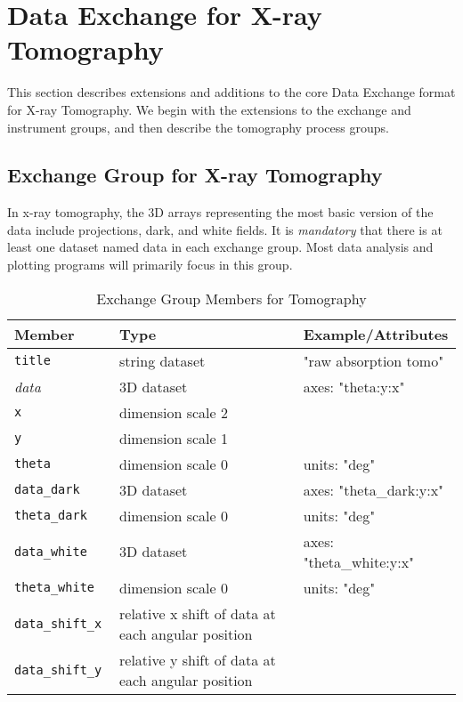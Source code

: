 \section{Data Exchange for X-ray Tomography}
\label{exchange:tomography}

This section describes extensions and additions to the core Data Exchange format for X-ray Tomography. We begin with the extensions to the exchange and instrument groups, and then describe the tomography process groups.

\subsection{Exchange Group for X-ray Tomography}

In x-ray tomography, the 3D arrays representing the most basic version of the data include projections, dark, and white fields. It is \emph{mandatory} that there is at least one dataset named data in each exchange group. Most data analysis and plotting programs will primarily focus in this group.

\begin{table}[h!]\sffamily \footnotesize
\caption{Exchange Group Members for Tomography}
\centering
{}
\begin{tabular}{l l l}
\toprule
\bfseries Member     & \bfseries Type & \bfseries Example/Attributes \\
\midrule
\tt{title}  & string dataset & "raw absorption tomo" \\
\emph{data}  & 3D dataset & axes: "theta:y:x"  \\
\tt{x} & dimension scale 2 &  \\
\tt{y} & dimension scale 1 &  \\
\tt{theta} & dimension scale 0 & units: "deg" \\
\tt{data\_dark} & 3D dataset & axes: "theta\_dark:y:x" \\
\tt{theta\_dark} & dimension scale 0 & units: "deg" \\
\tt{data\_white}  & 3D dataset & axes: "theta\_white:y:x" \\
\tt{theta\_white} & dimension scale 0 & units: "deg" \\
\tt{data\_shift\_x}  & relative x shift of data at each angular position & \\
\tt{data\_shift\_y}  & relative y shift of data at each angular position & \\
\bottomrule
\end{tabular}
\end{table}

